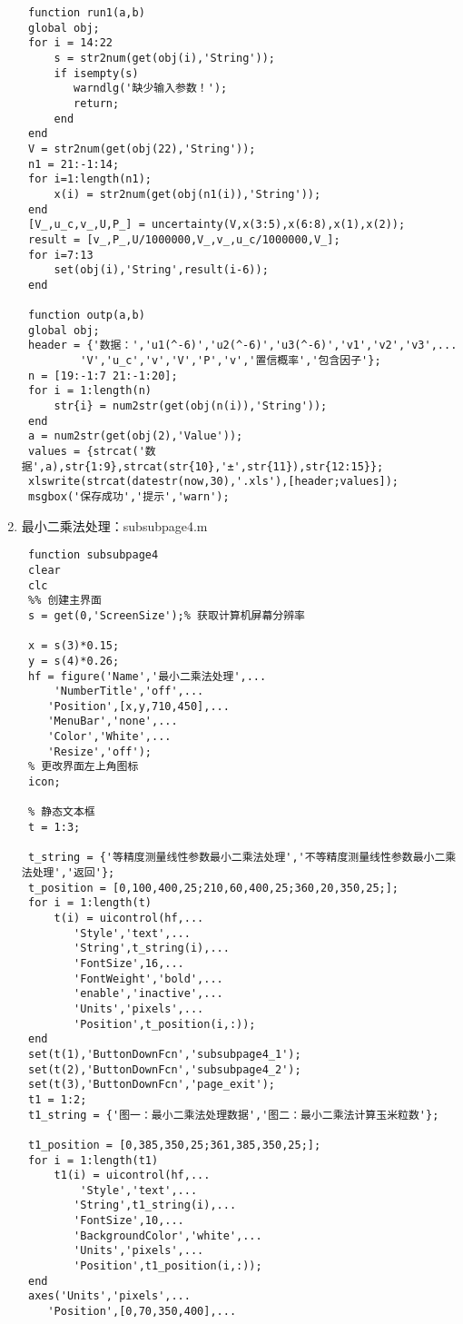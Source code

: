 \begin{enumerate}
\begin{lstlisting}
 function run1(a,b)
 global obj;
 for i = 14:22
     s = str2num(get(obj(i),'String'));
     if isempty(s)
 	    warndlg('缺少输入参数！');
 	    return;
     end
 end
 V = str2num(get(obj(22),'String'));
 n1 = 21:-1:14;
 for i=1:length(n1);
     x(i) = str2num(get(obj(n1(i)),'String'));
 end
 [V_,u_c,v_,U,P_] = uncertainty(V,x(3:5),x(6:8),x(1),x(2));
 result = [v_,P_,U/1000000,V_,v_,u_c/1000000,V_];
 for i=7:13
     set(obj(i),'String',result(i-6));
 end
 
 function outp(a,b)
 global obj;
 header = {'数据：','u1(^-6)','u2(^-6)','u3(^-6)','v1','v2','v3',...
         'V','u_c','v','V','P','v','置信概率','包含因子'};
 n = [19:-1:7 21:-1:20];
 for i = 1:length(n)
     str{i} = num2str(get(obj(n(i)),'String'));
 end
 a = num2str(get(obj(2),'Value'));
 values = {strcat('数据',a),str{1:9},strcat(str{10},'±',str{11}),str{12:15}};
 xlswrite(strcat(datestr(now,30),'.xls'),[header;values]);
 msgbox('保存成功','提示','warn');\end{lstlisting}
	\item 最小二乘法处理：subsubpage4.m
	\begin{lstlisting}
 function subsubpage4
 clear
 clc
 %% 创建主界面
 s = get(0,'ScreenSize');% 获取计算机屏幕分辨率
 
 x = s(3)*0.15;
 y = s(4)*0.26;
 hf = figure('Name','最小二乘法处理',...
     'NumberTitle','off',...
    'Position',[x,y,710,450],...
    'MenuBar','none',...
    'Color','White',...
    'Resize','off');
 % 更改界面左上角图标
 icon;

 % 静态文本框
 t = 1:3;
 
 t_string = {'等精度测量线性参数最小二乘法处理','不等精度测量线性参数最小二乘法处理','返回'};
 t_position = [0,100,400,25;210,60,400,25;360,20,350,25;];
 for i = 1:length(t)
     t(i) = uicontrol(hf,...
        'Style','text',...
        'String',t_string(i),...
        'FontSize',16,...
        'FontWeight','bold',...
        'enable','inactive',...
        'Units','pixels',...
        'Position',t_position(i,:));
 end
 set(t(1),'ButtonDownFcn','subsubpage4_1');
 set(t(2),'ButtonDownFcn','subsubpage4_2');
 set(t(3),'ButtonDownFcn','page_exit');
 t1 = 1:2;
 t1_string = {'图一：最小二乘法处理数据','图二：最小二乘法计算玉米粒数'};

 t1_position = [0,385,350,25;361,385,350,25;];
 for i = 1:length(t1)
     t1(i) = uicontrol(hf,...
         'Style','text',...
        'String',t1_string(i),...
        'FontSize',10,...
        'BackgroundColor','white',...
        'Units','pixels',...
        'Position',t1_position(i,:));
 end
 axes('Units','pixels',...
    'Position',[0,70,350,400],...


\end{lstlisting}
\end{enumerate}
